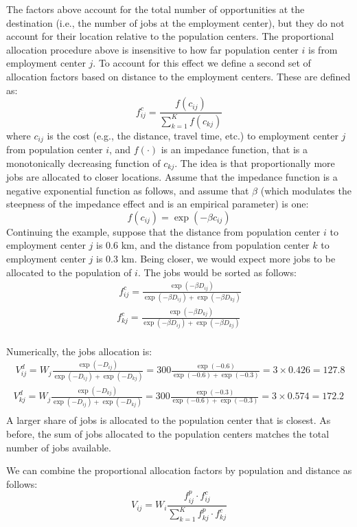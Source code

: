 \documentclass[]{elsarticle} %
\begin{document}
The factors above account for the total number of opportunities at the
destination (i.e., the number of jobs at the employment center), but
they do not account for their location relative to the population
centers. The proportional allocation procedure above is insensitive to
how far population center \(i\) is from employment center \(j\). To
account for this effect we define a second set of allocation factors
based on distance to the employment centers. These are defined as: \[
f^c_{ij} = \frac{f(c_{ij})}{\sum_{k=1}^K f(c_{kj})}
\] \noindent where \(c_{ij}\) is the cost (e.g., the distance, travel
time, etc.) to employment center \(j\) from population center \(i\), and
\(f(\cdot)\) is an impedance function, that is a monotonically
decreasing function of \(c_{kj}\). The idea is that proportionally more
jobs are allocated to closer locations. Assume that the impedance
function is a negative exponential function as follows, and assume that
\(\beta\) (which modulates the steepness of the impedance effect and is
an empirical parameter) is one: \[
f(c_{ij}) = \exp(-\beta c_{ij})
\] Continuing the example, suppose that the distance from population
center \(i\) to employment center \(j\) is 0.6 km, and the distance from
population center \(k\) to employment center \(j\) is 0.3 km. Being
closer, we would expect more jobs to be allocated to the population of
\(i\). The jobs would be sorted as follows: \[
\begin{array}{l}\
f^c_{ij} = \frac{\exp(-\beta D_{ij})}{\exp(-\beta D_{ij}) + \exp(-\beta D_{kj})}\\
f^c_{kj} = \frac{\exp(-\beta D_{kj})}{\exp(-\beta D_{ij}) + \exp(-\beta D_{kj})}\\
\end{array}
\]

Numerically, the jobs allocation is: \[
\begin{array}{l}\
V^d_{ij} = W_j\frac{\exp(-D_{ij})}{\exp(-D_{ij}) + \exp(-D_{kj})} = 300\frac{\exp(-0.6)}{\exp(-0.6) + \exp(-0.3)} = 3\times 0.426 = 127.8\\
V^d_{kj} = W_j\frac{\exp(-D_{kj})}{\exp(-D_{ij}) + \exp(-D_{kj})} = 300\frac{\exp(-0.3)}{\exp(-0.6) + \exp(-0.3)} = 3\times  0.574 = 172.2\\
\end{array}
\] A larger share of jobs is allocated to the population center that is
closest. As before, the sum of jobs allocated to the population centers
matches the total number of jobs available.

We can combine the proportional allocation factors by population and
distance as follows: \[
V_{ij} = W_i\frac{f^p_{ij} \cdot f^c_{ij}}{\sum_{k=1}^K f^p_{kj} \cdot f^c_{kj}}
\]
\end{document}
